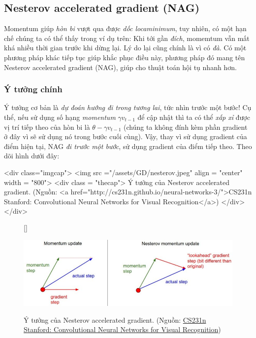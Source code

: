  
\subsection{Nesterov accelerated gradient (NAG)}
 
Momentum giúp \textit{hòn bi} vượt qua được \textit{dốc locaminimum}, tuy nhiên, có một hạn chế chúng ta có thể thấy trong ví dụ trên: Khi tới gần \textit{đích}, momemtum vẫn mất khá nhiều thời gian trước khi dừng lại. Lý do lại cũng chính là vì có \textit{đà}. Có một phương pháp khác tiếp tục giúp khắc phục điều này, phương pháp đó mang tên Nesterov accelerated gradient (NAG), giúp cho thuật toán hội tụ nhanh hơn.  
 
 
\subsubsection{Ý tưởng chính }
 
Ý tưởng cơ bản là \textit{dự đoán hướng đi trong tương lai}, tức nhìn trước một bước! Cụ thể, nếu sử dụng số hạng \textit{momentum} $\gamma v_{t-1}$ để cập nhật thì ta có thể \textit{xấp xỉ} được vị trí tiếp theo của hòn bi là $\theta - \gamma v_{t-1}$ (chúng ta không đính kèm phần gradient ở đây vì sẽ sử dụng nó trong bước cuối cùng). Vậy, thay vì sử dụng gradient của điểm hiện tại, NAG \textit{đi trước một bước}, sử dụng gradient của điểm tiếp theo. Theo dõi hình dưới đây: 
 
<div class="imgcap"> 
 <img src ="/assets/GD/nesterov.jpeg" align = "center" width = "800"> 
 <div class = "thecap"> Ý tưởng của Nesterov accelerated gradient. (Nguồn: <a href="http://cs231n.github.io/neural-networks-3/">CS231n Stanford: Convolutional Neural Networks for Visual Recognition</a>) </div> 
</div> 
\begin{figure}[t]
    [\FBwidth]
    {\caption{ 
    Ý tưởng của Nesterov accelerated gradient. (Nguồn: \href{http://cs231n.github.io/neural-networks-3/}{CS231n Stanford: Convolutional Neural Networks for Visual Recognition})
    }
    \label{fig:8_nag}}
    { %
    \includegraphics[width=.7\textwidth]{Chapters/04_GradientDescent/GD/nesterov.jpeg}
    }
\end{figure}

